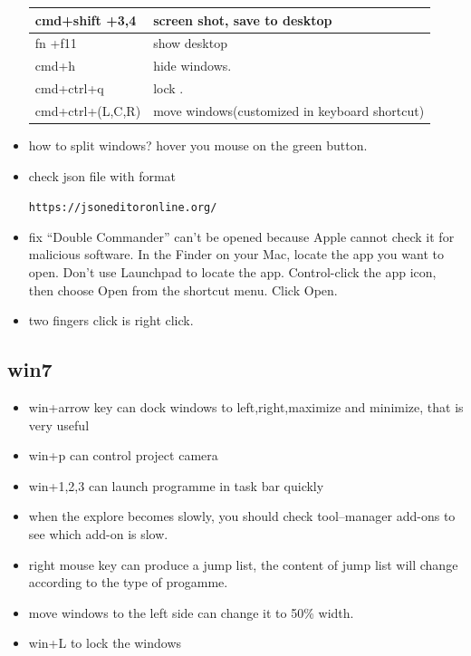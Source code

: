 \documentclass[paper=8.5in:11in, twoside, 12pt, pagesize=pdftex]{book}
\begin{document}
\begin{itemize}
\begin{tabular}{|p{}|p{}|}
  	\hline
  	cmd+shift +3,4& screen shot, save to desktop  \\
  	
  	\hline
  	fn +f11& show desktop  \\
  	
  	\hline
  	cmd+h & hide windows.  \\
  	
  	\hline
  	cmd+ctrl+q  & lock .  \\
  	
  	\hline	
  	cmd+ctrl+(L,C,R)  & move windows(customized in keyboard shortcut)  \\
  	\hline
  \end{tabular}
  
  \item how to split windows? hover you mouse on the green button. 
  
  \item check json file with format
  
  \verb |https://jsoneditoronline.org/ |
  
  \item fix “Double Commander” can’t be opened because Apple cannot check it for malicious software. In the Finder  on your Mac, locate the app you want to open.
  Don’t use Launchpad to locate the app.
  Control-click the app icon, then choose Open from the shortcut menu. Click Open.
  
  \item two fingers click is right click. 
  
\end{itemize}

\subsection{win7}

\begin{itemize}
\item win+arrow key can dock windows to left,right,maximize and minimize, that is very useful
\item win+p can control project camera
\item win+1,2,3 can launch programme in task bar quickly
\item when the explore becomes slowly, you should check tool--manager add-ons to see which add-on is slow.
\item right mouse key can produce a jump list, the content of jump list will change according to the type of progamme.
\item move windows to the left side can change it to 50\% width.
\item win+L to lock the windows
\end{itemize}
\end{document}
